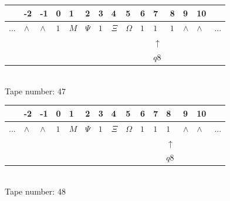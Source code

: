 \documentclass[11pt]{article}
\begin{document}
\begin{table}[H]
\centering
\begin{tabular}{lllllllllllllll}
 & -2 & -1 & 0 & 1 & 2 & 3 & 4 & 5 & 6 & 7 & 8 & 9 & 10 & \\
\hline
$...$ & \multicolumn{1}{|l|}{$\wedge$} & \multicolumn{1}{|l|}{$\wedge$} & \multicolumn{1}{|l|}{$1$} & \multicolumn{1}{|l|}{$M$} & \multicolumn{1}{|l|}{$\Psi$} & \multicolumn{1}{|l|}{$1$} & \multicolumn{1}{|l|}{$\Xi$} & \multicolumn{1}{|l|}{$\Omega$} & \multicolumn{1}{|l|}{$1$} & \multicolumn{1}{|l|}{$1$} & \multicolumn{1}{|l|}{$1$} & \multicolumn{1}{|l|}{$\wedge$} & \multicolumn{1}{|l|}{$\wedge$} & $...$\\
\hline
&  &  &  &  &  &  &  &  &  & $\uparrow$ &  &  &  &  \\
&  &  &  &  &  &  &  &  &  & $ q8 $ &  &  &  &  \\
\end{tabular}
\\
Tape number: 47
\noindent\makebox[\linewidth]{\hdashrule{\textwidth}{1pt}{1pt}}\end{table}
\clearpage

\begin{table}[H]
\centering
\begin{tabular}{lllllllllllllll}
 & -2 & -1 & 0 & 1 & 2 & 3 & 4 & 5 & 6 & 7 & 8 & 9 & 10 & \\
\hline
$...$ & \multicolumn{1}{|l|}{$\wedge$} & \multicolumn{1}{|l|}{$\wedge$} & \multicolumn{1}{|l|}{$1$} & \multicolumn{1}{|l|}{$M$} & \multicolumn{1}{|l|}{$\Psi$} & \multicolumn{1}{|l|}{$1$} & \multicolumn{1}{|l|}{$\Xi$} & \multicolumn{1}{|l|}{$\Omega$} & \multicolumn{1}{|l|}{$1$} & \multicolumn{1}{|l|}{$1$} & \multicolumn{1}{|l|}{$1$} & \multicolumn{1}{|l|}{$\wedge$} & \multicolumn{1}{|l|}{$\wedge$} & $...$\\
\hline
&  &  &  &  &  &  &  &  &  &  & $\uparrow$ &  &  &  \\
&  &  &  &  &  &  &  &  &  &  & $ q8 $ &  &  &  \\
\end{tabular}
\\
Tape number: 48
\noindent\makebox[\linewidth]{\hdashrule{\textwidth}{1pt}{1pt}}\end{table}
\end{document}
